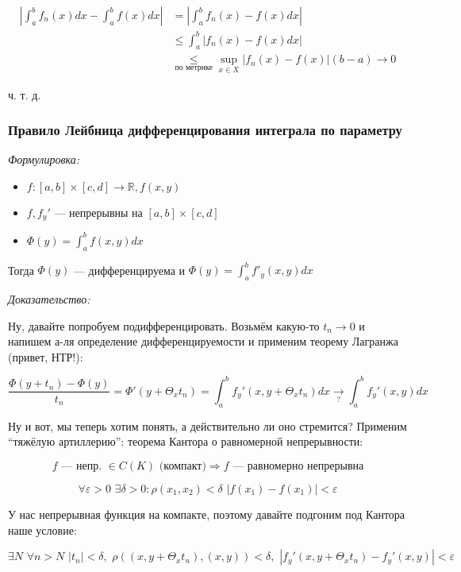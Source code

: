 \documentclass{article}
\def\dbl{\,\,}
\begin{document}
\begin{align*}
    \left|\int_a^b{f_n(x)dx} - \int_a^b{f(x)dx}\right|
 &=  \left|\int_a^b{f_n(x) - f(x)dx}\right| \\
  &\le \int_a^b \left|f_n(x) - f(x) dx\right| \\ 
  &\underset{\text{по метрике}}{\le} {\sup_{x \in X} \left|f_n(x) - f(x)\right|}(b - a) \rightarrow 0
\end{align*}

ч. т. д.

\subsubsection{Правило Лейбница дифференцирования интеграла по параметру}
\textit{Формулировка:}

\begin{itemize}
    \item $f: [a, b] \times [c, d] \rightarrow \mathbb{R}, f(x, y)$
    \item $f, f_y'$ --- непрерывны на $[a, b] \times [c, d]$
    \item $\Phi(y) = \int_a^b f(x, y) dx$
\end{itemize}

Тогда $\Phi(y)$ --- дифференцируема и $\Phi(y) = \int_a^b f'_y(x, y) dx$

\textit{Доказательство:}

Ну, давайте попробуем подифференцировать. Возьмём какую-то $t_n \rightarrow 0$ и напишем а-ля определение дифференцируемости и применим теорему Лагранжа (привет, НТР!):

\[\frac{\Phi(y + t_n) - \Phi(y)}{t_n} = \Phi'(y + \Theta_x t_n) = \int_a^b f_y'(x, y + \Theta_x t_n) dx \underset{?}{\longrightarrow} \int_a^b f_y'(x, y) dx\]

Ну и вот, мы теперь хотим понять, а действительно ли оно стремится? Применим ``тяжёлую артиллерию'': теорема Кантора о равномерной непрерывности:

\[f \text{ --- непр. } \in C(K) \text{ (компакт)} \Rightarrow f\text{ --- равномерно непрерывна}\]

\[\forall \varepsilon > 0 \dbl \exists \delta > 0: \rho(x_1, x_2) < \delta \dbl |f(x_1) - f(x_1)| < \varepsilon\]

У нас непрерывная функция на компакте, поэтому давайте подгоним под Кантора наше условие:

\[\exists N \dbl \forall n > N \dbl |t_n| < \delta, \dbl \rho((x, y + \Theta_x t_n), (x, y)) < \delta, \dbl
\left|f_y'(x, y + \Theta_x t_n) - {f_y'(x, y)}\right| < \varepsilon\]
\end{document}
